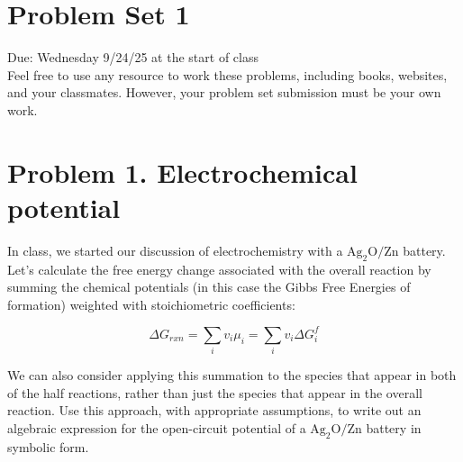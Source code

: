 \documentclass[12pt]{article}
\begin{document}
\section*{Problem Set 1}
Due: Wednesday 9/24/25 at the start of class\\
Feel free to use any resource to work these problems, including books, websites, and your classmates. However, your problem set submission must be your own work.

\section{Problem 1. Electrochemical potential}
In class, we started our discussion of electrochemistry with a $\mathrm{Ag}_{2} \mathrm{O} / \mathrm{Zn}$ battery. Let's calculate the free energy change associated with the overall reaction by summing the chemical potentials (in this case the Gibbs Free Energies of formation) weighted with stoichiometric coefficients:

$$
\Delta G_{r x n}=\sum_{i} v_{i} \mu_{i}=\sum_{i} v_{i} \Delta G_{i}^{f}
$$

We can also consider applying this summation to the species that appear in both of the half reactions, rather than just the species that appear in the overall reaction. Use this approach, with appropriate assumptions, to write out an algebraic expression for the open-circuit potential of a $\mathrm{Ag}_{2} \mathrm{O} / \mathrm{Zn}$ battery in symbolic form.
\end{document}
